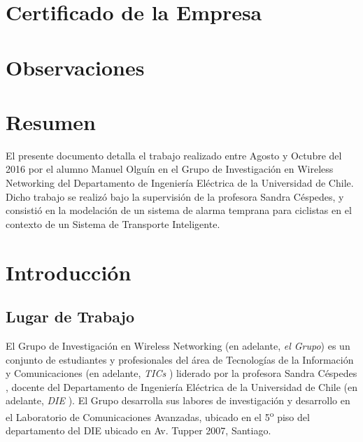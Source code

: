 \documentclass[11pt,letterpaper]{article}
\begin{document}

\renewcommand{\sectionmark}[1]{\markright{\thesection.\ #1}}
\renewcommand{\headrulewidth}{0.5pt}
\renewcommand{\footrulewidth}{0.5pt}

\newpage
\section{Certificado de la Empresa}
\newpage
\section{Observaciones}
\newpage

\tableofcontents
\listoffigures

\newpage
\section{Resumen}

El presente documento detalla el trabajo realizado entre Agosto y Octubre del 2016 por el alumno Manuel Olguín en el Grupo de Investigación en Wireless Networking del Departamento de Ingeniería Eléctrica de la Universidad de Chile. Dicho trabajo se realizó bajo la supervisión de la profesora Sandra Céspedes, y consistió en la modelación de un sistema de alarma temprana para ciclistas en el contexto de un Sistema de Transporte Inteligente.

\newpage
\section{Introducción}
\subsection{Lugar de Trabajo}

El Grupo de Investigación en Wireless Networking (en adelante, \emph{el Grupo}) es un conjunto de estudiantes y profesionales del área de Tecnologías de la Información y Comunicaciones (en adelante, \emph{TICs} \cite{TICS}) liderado por la profesora Sandra Céspedes \cite{scespedes}, docente del Departamento de Ingeniería Eléctrica de la Universidad de Chile (en adelante, \emph{DIE} \cite{DIE}). El Grupo desarrolla sus labores de investigación y desarrollo en el Laboratorio de Comunicaciones Avanzadas, ubicado en el 5\textsuperscript{o} piso del departamento del DIE ubicado en Av. Tupper 2007, Santiago.
\end{document}
